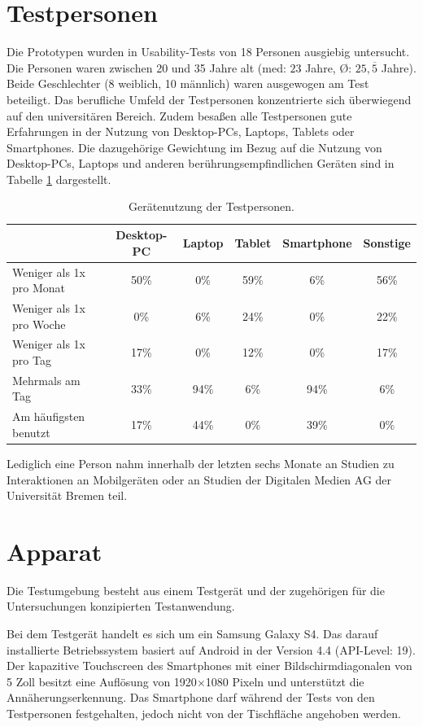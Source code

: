 \documentclass[a4paper,12pt,bibliography=totoc]{scrreprt}%
\begin{document}
\section{Testpersonen}
Die Prototypen wurden in Usability-Tests von 18 Personen ausgiebig untersucht. Die Personen waren zwischen 20 und 35 Jahre alt (med: $23$ Jahre, \O: $25{,}\overline 5$ Jahre). Beide Geschlechter (8 weiblich, 10 männlich) waren ausgewogen am Test beteiligt. Das berufliche Umfeld der Testpersonen konzentrierte sich überwiegend auf den universitären Bereich. Zudem besaßen alle Testpersonen gute Erfahrungen in der Nutzung von Desktop-PCs, Laptops, Tablets oder Smartphones. Die dazugehörige Gewichtung im Bezug auf die Nutzung von Desktop-PCs, Laptops und anderen berührungsempfindlichen Geräten sind in Tabelle \ref{nutzungtestpersonen} dargestellt.
\begin{table}
\centering
\renewcommand{\arraystretch}{2}
\setlength{\tabcolsep}{4pt}
\begin{tabular}{ p{4.8cm} | c c c c c}
& Desktop-PC & Laptop & Tablet & Smartphone & Sonstige\\\hline
Weniger als 1x pro Monat & 50\% & 0\% & 59\% & 6\% & 56\%\\
Weniger als 1x pro Woche & 0\% & 6\% & 24\% & 0\% & 22\% \\
Weniger als 1x pro Tag & 17\% & 0\% & 12\% & 0\% & 17\% \\
Mehrmals am Tag & 33\% & 94\% & 6\% & 94\% & 6\% \\
\hline
Am häufigsten benutzt & 17\% & 44\% & 0\% & 39\% & 0\% \\
\end{tabular}
\caption{Gerätenutzung der Testpersonen.}
\label{nutzungtestpersonen}
\end{table}
Lediglich eine Person nahm innerhalb der letzten sechs Monate an Studien zu Interaktionen an Mobilgeräten oder an Studien der Digitalen Medien AG der Universität Bremen teil.

\section{Apparat}
Die Testumgebung besteht aus einem Testgerät und der zugehörigen für die Untersuchungen konzipierten Testanwendung.

Bei dem Testgerät handelt es sich um ein Samsung Galaxy S4. Das darauf installierte Betriebssystem basiert auf Android in der Version 4.4 (API-Level: 19). Der kapazitive Touchscreen des Smartphones mit einer Bildschirmdiagonalen von 5 Zoll besitzt eine Auflösung von 1920$\times$1080 Pixeln und unterstützt die Annäherungserkennung. Das Smartphone darf während der Tests von den Testpersonen festgehalten, jedoch nicht von der Tischfläche angehoben werden.
\end{document}
